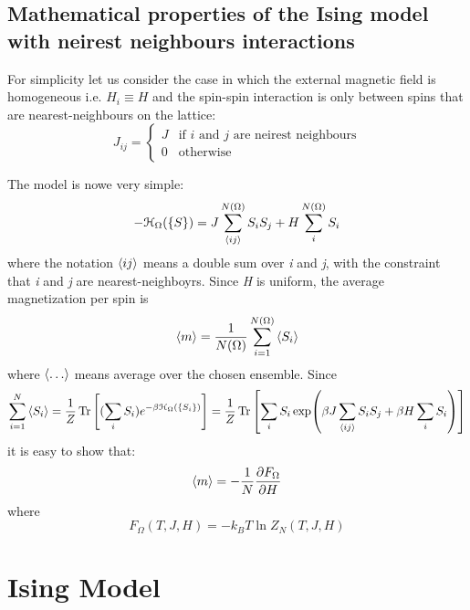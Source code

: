 \documentclass[../main/main.tex]{subfiles}
\begin{document}
\subsection{Mathematical properties of the Ising model with neirest neighbours interactions}
For simplicity let us consider the case in which the external magnetic field is homogeneous i.e. \( H_i \equiv H \) and the spin-spin interaction is only between spins that are nearest-neighbours on the lattice:
\begin{equation}
J_{ij} =
  \begin{cases}
  J & \text{if } i \text{ and } j \text{ are neirest neighbours} \\
  0 & \text{otherwise}
  \end{cases}
\end{equation}

The model is nowe very simple:
\begin{equation}
  - \mathcal{H}_ \Omega ( \{ S \}  ) = J \sum_{\expval{ij} }^{N (\Omega )} S_i S_j + H \sum_{i}^{N(\Omega )} S_i
\end{equation}
where the notation \( \expval{ij}  \) means a double sum over \emph{i} and \emph{j}, with the constraint that \emph{i} and \emph{j} are nearest-neighboyrs.
Since \emph{H} is uniform, the average magnetization per spin is
\begin{equation}
  \expval{m} = \frac{1}{N (\Omega )} \sum_{i=1}^{N (\Omega )} \expval{S_i}
\end{equation}
where \( \expval{\dots}  \)  means average over the chosen ensemble.
Since
\begin{equation}
  \sum_{i=1}^{N} \expval{S_i} = \frac{1}{Z} \Tr \qty[(\sum_{i}^{} S_i ) e^{-\beta \mathcal{H}_ \Omega (\{ S_i \}  )} ]  = \frac{1}{Z} \Tr \qty[\sum_{i}^{} S_i \exp (\beta  J \sum_{\expval{ij} }^{} S_i S_j + \beta H \sum_{i}^{} S_i  )  ]
\end{equation}
it is easy to show that:
\begin{equation}
  \expval{m} = - \frac{1}{N} \pdv{F_ \Omega }{H}
\end{equation}
where
\begin{equation}
  F_ \Omega (T,J,H) = - k_B T \ln{Z_N (T,J,H)} 
\end{equation}



\clearpage


\section{Ising Model}
\end{document}
